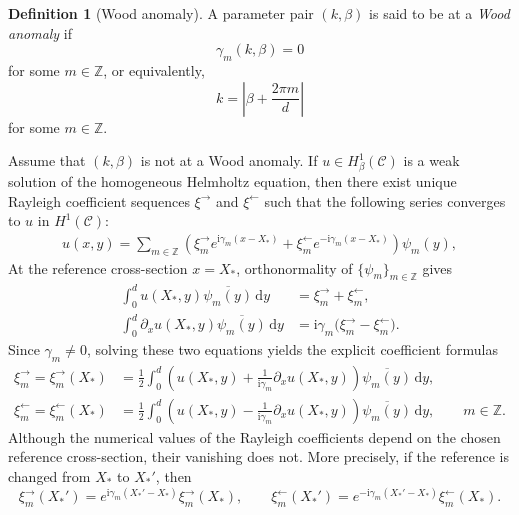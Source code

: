 \documentclass[11pt,fleqn]{article}
\newcommand{\ii}{\mathrm{i}}
\newcommand{\dd}{\mathrm{d}}
\theoremstyle{definition}
\newtheorem{definition}{Definition}
\theoremstyle{remark}
\begin{document}
\begin{definition}[Wood anomaly]
A parameter pair $(k,\beta)$ is said to be at a \emph{Wood anomaly}
if
\[
  \gamma_m(k,\beta)=0
\]
for some $m\in\mathbb Z$, or equivalently,
\[
  k=\left|\beta+\frac{2\pi m}{d}\right|
\]
for some $m\in\mathbb Z$.
\end{definition}

Assume that \((k,\beta)\) is not at a Wood anomaly. If
\(u\in H^1_\beta(\mathcal C)\) is a weak solution of the homogeneous
Helmholtz equation, then there exist unique Rayleigh coefficient
sequences \(\xi^\rightarrow\) and \(\xi^\leftarrow\) such that the following
series converges to \(u\) in \(H^1(\mathcal C)\):
\begin{align}
u(x,y)=
\sum_{m\in\mathbb Z}
\left(
\xi_m^\rightarrow e^{\ii\gamma_m (x - X_*)}
+
\xi_m^\leftarrow e^{-\ii\gamma_m (x - X_*)}
\right)\psi_m(y),
\label{eq:rayleigh-expansion-centered}
\end{align}
At the reference cross-section \(x=X_*\), orthonormality of
\(\{\psi_m\}_{m\in\mathbb Z}\) gives
\begin{align*}
  \int_0^d u(X_*,y)\overline{\psi_m(y)}\,\dd y
  &=\xi_m^\rightarrow+\xi_m^\leftarrow,\\
  \int_0^d \partial_xu(X_*,y)\overline{\psi_m(y)}\,\dd y
  &=\ii\gamma_m\bigl(\xi_m^\rightarrow-\xi_m^\leftarrow\bigr).
\end{align*}
Since \(\gamma_m\neq0\), solving these two equations yields the explicit
coefficient formulas
\begin{align}
  \xi_m^\rightarrow = \xi_m^\rightarrow(X_*)
  &=\frac{1}{2}\int_0^d
  \left(
    u(X_*,y)+\frac{1}{\ii\gamma_m}\partial_xu(X_*,y)
  \right)\overline{\psi_m(y)}\,\dd y,
  \label{eq:right-coefficient-extraction}
  \\
  \xi_m^\leftarrow = \xi_m^\leftarrow(X_*)
  &=\frac{1}{2}\int_0^d
  \left(
    u(X_*,y)-\frac{1}{\ii\gamma_m}\partial_xu(X_*,y)
  \right)\overline{\psi_m(y)}\,\dd y,
  \qquad m\in\mathbb Z.
  \label{eq:left-coefficient-extraction}
\end{align}
Although the numerical values of the Rayleigh coefficients depend on the
chosen reference cross-section, their vanishing does not. More precisely, if
the reference is changed from \(X_*\) to \(X_*'\), then
\[
  \xi_m^\rightarrow(X_*')
  =e^{\ii\gamma_m(X_*'-X_*)}\xi_m^\rightarrow(X_*),
  \qquad
  \xi_m^\leftarrow(X_*')
  =e^{-\ii\gamma_m(X_*'-X_*)}\xi_m^\leftarrow(X_*).
\]
\end{document}
